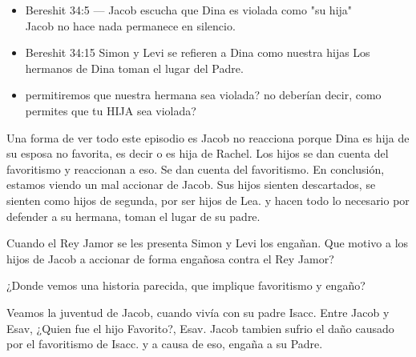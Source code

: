 \documentclass[conference]{IEEEtran}
\begin{document}
\begin{itemize}
%
 
\item
Bereshit 34:5 --- Jacob escucha que Dina es violada como "su hija" \\
Jacob no hace nada permanece en silencio.

\item Bereshit 34:15
Simon y Levi se refieren a Dina como nuestra hijas
Los hermanos de Dina toman el lugar del Padre.

\item 
permitiremos  que nuestra hermana sea violada?
no deberían decir, como permites que tu HIJA sea violada?

\end{itemize}



Una forma de ver todo este episodio es Jacob no reacciona porque Dina es hija de su esposa no favorita, es decir o es hija de Rachel. Los hijos se dan cuenta del favoritismo y reaccionan a eso.
Se dan cuenta del favoritismo.
En conclusión, estamos viendo un mal accionar de Jacob. 
Sus hijos sienten descartados, se sienten como hijos de segunda, por ser hijos de Lea.
y hacen todo lo necesario por defender a su hermana, toman el lugar de su padre. 

Cuando el Rey Jamor se les presenta Simon y Levi los engañan.
Que motivo a los hijos de Jacob a accionar de forma engañosa contra el Rey Jamor?

¿Donde vemos una historia parecida, que implique favoritismo y engaño?

Veamos la juventud de Jacob, cuando vivía con su padre Isacc.
Entre Jacob y Esav, ¿Quien fue el hijo Favorito?, Esav.
Jacob tambien sufrio el daño causado por el favoritismo de Isacc.
y a causa de eso, engaña a su Padre. 
\end{document}
